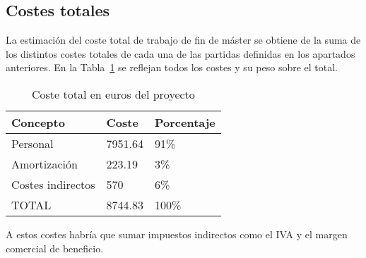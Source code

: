 \subsection{Costes totales}

La estimación del coste total de trabajo de fin de máster se obtiene de la suma de los distintos costes totales de cada una de las partidas definidas en los apartados anteriores.
En la Tabla~\ref{tab:coste-total} se reflejan todos los costes y su peso sobre el total.

\begin{table}
    \centering
    \begin{tabular}{lll}
        \toprule
        Concepto          & Coste   & Porcentaje \\
        \midrule
        Personal          & 7951.64 & 91\%       \\
        Amortización      & 223.19  & 3\%        \\
        Costes indirectos & 570     & 6\%        \\
        \midrule
        TOTAL             & 8744.83 & 100\%      \\
        \bottomrule
    \end{tabular}
    \caption{Coste total en euros del proyecto}
    \label{tab:coste-total}
\end{table}

A estos costes habría que sumar impuestos indirectos como el IVA y el margen comercial de beneficio.
